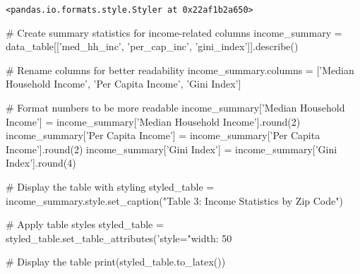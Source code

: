 \documentclass[11pt]{article}
\begin{document}
    
    \begin{Verbatim}[commandchars=\\\{\}]
<pandas.io.formats.style.Styler at 0x22af1b2a650>
    \end{Verbatim}
    # Create summary statistics for income-related columns
    income_summary = data_table[['med_hh_inc', 'per_cap_inc', 'gini_index']].describe()
    
    # Rename columns for better readability
    income_summary.columns = ['Median Household Income', 'Per Capita Income', 'Gini Index']
    
    # Format numbers to be more readable
    income_summary['Median Household Income'] = income_summary['Median Household Income'].round(2)
    income_summary['Per Capita Income'] = income_summary['Per Capita Income'].round(2)
    income_summary['Gini Index'] = income_summary['Gini Index'].round(4)
    
    # Display the table with styling
    styled_table = income_summary.style.set_caption("Table 3: Income Statistics by Zip Code")
    
    # Apply table styles
    styled_table = styled_table.set_table_attributes('style="width: 50%
    
    # Display the table
    print(styled_table.to_latex())
    
\end{document}
